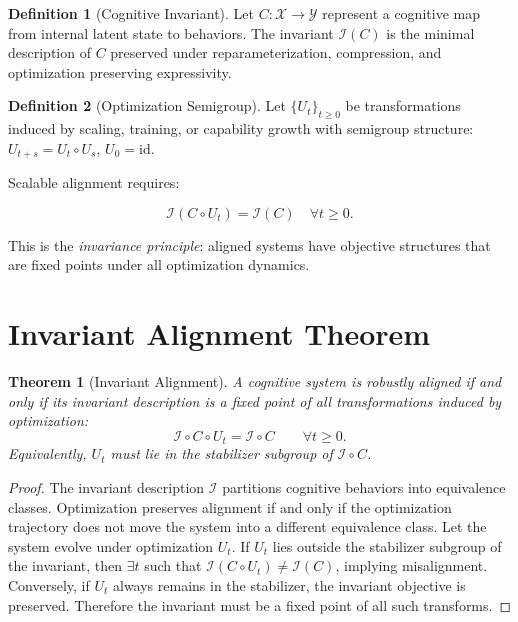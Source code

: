 \documentclass[11pt,a4paper]{article}
\theoremstyle{plain}
\newtheorem{theorem}{Theorem}[section]
\theoremstyle{definition}
\newtheorem{definition}{Definition}[section]
\numberwithin{equation}{section}
\begin{document}
\begin{definition}[Cognitive Invariant]
Let $C: \mathcal{X} \to \mathcal{Y}$ represent a cognitive map from internal latent state to behaviors. The invariant $\mathcal{I}(C)$ is the minimal description of $C$ preserved under reparameterization, compression, and optimization preserving expressivity.
\end{definition}

\begin{definition}[Optimization Semigroup]
Let $\{U_t\}_{t \ge 0}$ be transformations induced by scaling, training, or capability growth with semigroup structure: $U_{t+s}=U_t\circ U_s$, $U_0 = \mathrm{id}$.
\end{definition}

Scalable alignment requires:

\[
\mathcal{I}(C \circ U_t) = \mathcal{I}(C) \quad \forall t \ge 0.
\]

This is the \emph{invariance principle}: aligned systems have objective structures that are fixed points under all optimization dynamics.


\section{Invariant Alignment Theorem}

\begin{theorem}[Invariant Alignment]\label{thm:invariant}
A cognitive system is robustly aligned if and only if its invariant description is a fixed point of all transformations induced by optimization:
\[
\mathcal{I} \circ C \circ U_t = \mathcal{I} \circ C \qquad \forall t \ge 0.
\]
Equivalently, $U_t$ must lie in the stabilizer subgroup of $\mathcal{I}\circ C$.
\end{theorem}

\begin{proof}
The invariant description $\mathcal{I}$ partitions cognitive behaviors into equivalence classes. Optimization preserves alignment if and only if the optimization trajectory does not move the system into a different equivalence class. Let the system evolve under optimization $U_t$. If $U_t$ lies outside the stabilizer subgroup of the invariant, then $\exists t$ such that $\mathcal{I}(C \circ U_t) \neq \mathcal{I}(C)$, implying misalignment. Conversely, if $U_t$ always remains in the stabilizer, the invariant objective is preserved. Therefore the invariant must be a fixed point of all such transforms.
\end{proof}
\end{document}
